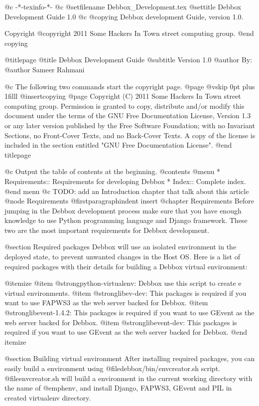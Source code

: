    @c -*-texinfo-*-
@c %
@setfilename Debbox_Development.tex
@settitle Debbox Development Guide 1.0
@c %
@copying
Debbox development Guide, version 1.0.

Copyright @copyright{} 2011 Some Hackers In Town street computing group.
@end copying

@titlepage
@title Debbox Development Guide
@subtitle Version 1.0
@author By:
@author Sameer Rahmani

@c The following two commands start the copyright page.
@page
@vskip 0pt plus 1filll
@insertcopying
@page
Copyright (C)  2011  Some Hackers In Town street computing group.
Permission is granted to copy, distribute and/or modify this document
under the terms of the GNU Free Documentation License, Version 1.3
or any later version published by the Free Software Foundation;
with no Invariant Sections, no Front-Cover Texts, and no Back-Cover Texts.
A copy of the license is included in the section entitled "GNU
Free Documentation License".
@end titlepage

@c Output the table of contents at the beginning.
@contents
@menu
* Requirements::        Requirements for developing Debbox
* Index::            Complete index.
@end menu
@c TODO: add an Introduction chapter that talk about this article
@node Requirements
@firstparagraphindent insert
@chapter Requirements
Before jumping in the Debbox development process make sure that you have enough knowledge to use
Python programming language and Django framework. These two are the most important requirements
for Debbox development.

@section Required packages
Debbox will use an isolated environment in the deployed state, to prevent unwanted changes in the
Host OS. Here is a list of required packages with their details for building a Debbox virtual environment:

@itemize
@item
@strong{python-virtualenv}: Debbox use this script to create e virtual environments.
@item
@strong{libev-dev}: This packages is required if you want to use FAPWS3 as the web server backed for Debbox.
@item
@strong{libevent-1.4.2}: This packages is required if you want to use GEvent as the web server backed for Debbox.
@item
@strong{libevent-dev}: This packages is required if you want to use GEvent as the web server backed for Debbox.
@end itemize

@section Building virtual environment
After installing required packages, you can easily build a environment using @file{debbox/bin/envcreator.sh} script. @file{envcreator.sh}
will build a environment in the current working directory with the name of @emph{env}, and install Django, FAPWS3, GEvent and PIL in created
virtualenv directory.

